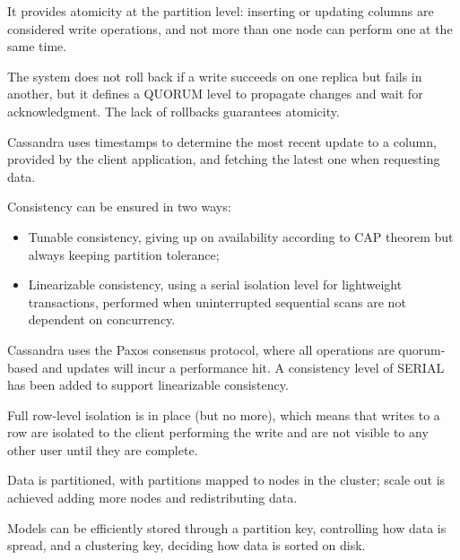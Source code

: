 It provides atomicity at the partition level: inserting or updating columns are considered write operations, and not more than one node can perform one at the same time.

The system does not roll back if a write succeeds on one replica but fails in another, but it defines a QUORUM level to propagate changes and wait for acknowledgment. The lack of rollbacks guarantees atomicity.

Cassandra uses timestamps to determine the most recent update to a column, provided by the client application, and fetching the latest one when requesting data.

Consistency can be ensured in two ways:
\begin{itemize}
	\item Tunable consistency, giving up on availability according to CAP theorem but always keeping partition tolerance;
	\item Linearizable consistency, using a serial isolation level for lightweight transactions, performed when uninterrupted sequential scans are not dependent on concurrency.
\end{itemize}

Cassandra uses the Paxos consensus protocol, where all operations are quorum-based and updates will incur a performance hit. A consistency level of SERIAL has been added to support linearizable consistency.

Full row-level isolation is in place (but no more), which means that writes to a row are isolated to the client performing the write and are not visible to any other user until they are complete.

Data is partitioned, with partitions mapped to nodes in the cluster; scale out is achieved adding more nodes and redistributing data. 

Models can be efficiently stored through a partition key, controlling how data is spread, and a clustering key, deciding how data is sorted on disk.
